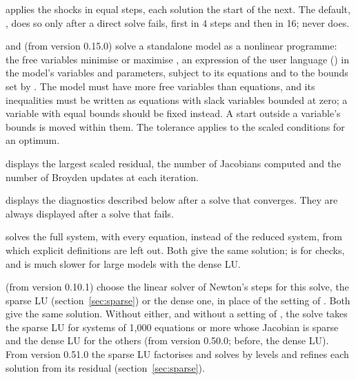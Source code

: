\begin{optdesc}
\item[\optarg{step}{s}{\#}] applies the shocks in \argu{\#} equal steps, each
solution the start of the next. The default, , does so only after
a direct solve fails, first in 4 steps and then in 16;  never
does.

\item[\optarg{min}{imize}{expression}] and 
(from version 0.15.0) solve a standalone model as a nonlinear programme: the
free variables minimise or maximise , an expression of the
user language () in the model's variables and
parameters, subject to its equations and to the bounds set by
. The model must have more free variables than equations,
and its inequalities must be written as equations with slack variables
bounded at zero; a variable with equal bounds should be fixed instead. A
start outside a variable's bounds is moved within them. The tolerance
applies to the scaled conditions for an optimum.

\item[\opt{}{trace}] displays the largest scaled residual, the number of
Jacobians computed and the number of Broyden updates at each iteration.

\item[\opt{diag}{nose}] displays the diagnostics described below after a solve
that converges. They are always displayed after a solve that fails.

\item[\opt{}{full}] solves the full system, with every equation, instead of the
reduced system, from which explicit definitions are left out. Both give the
same solution;  is for checks, and is much slower for large models
with the dense LU.

\item[\opt{sp}{arse}, \opt{den}{se}] (from version 0.10.1) choose the linear
solver of Newton's steps for this solve, the sparse LU
(section~\ref{sec:sparse}) or the dense one, in place of the setting of
. Both give the same solution. Without either, and
without a setting of , the solve takes the sparse LU for
systems of 1,000 equations or more whose Jacobian is sparse and the dense LU
for the others (from version 0.50.0; before, the dense LU). From version
0.51.0 the sparse LU factorises and solves by levels and refines each solution
from its residual (section~\ref{sec:sparse}).
\end{optdesc}

